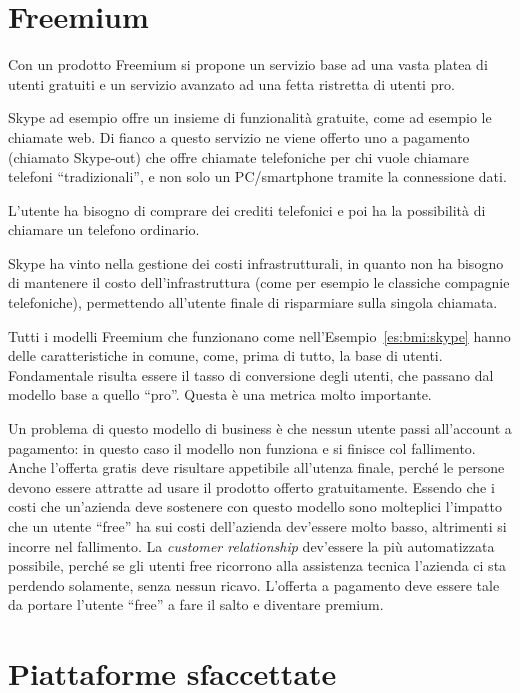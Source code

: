 \section{Freemium}

Con un prodotto Freemium si propone un servizio base ad una vasta platea di
utenti gratuiti e un servizio avanzato ad una fetta ristretta di utenti pro.

\begin{example}[Skype]\label{es:bmi:skype}
Skype ad esempio offre un insieme di funzionalità gratuite, come ad esempio le
chiamate web. Di fianco a questo servizio ne viene offerto uno a pagamento
(chiamato Skype-out) che offre chiamate telefoniche per chi vuole chiamare
telefoni ``tradizionali'', e non solo un PC/smartphone tramite la connessione
dati.

\noindent L'utente ha bisogno di comprare dei crediti telefonici e poi ha la
possibilità di chiamare un telefono ordinario.

\noindent Skype ha vinto nella gestione dei costi infrastrutturali, in quanto
non ha bisogno di mantenere il costo dell'infrastruttura (come per esempio le
classiche compagnie telefoniche), permettendo all'utente finale di risparmiare
sulla singola chiamata.
\end{example}

\noindent Tutti i modelli Freemium che funzionano come
nell'Esempio~\ref{es:bmi:skype} hanno delle caratteristiche in comune, come,
prima di tutto, la base di utenti.
Fondamentale risulta essere il tasso di conversione degli utenti, che passano
dal modello base a quello ``pro''. Questa è una metrica molto importante.

Un problema di questo modello di business è che nessun utente passi all'account
a pagamento: in questo caso il modello non funziona e si finisce col
fallimento. Anche l'offerta gratis deve risultare appetibile all'utenza finale,
perché le persone devono essere attratte ad usare il prodotto offerto
gratuitamente. Essendo che i costi che un'azienda deve sostenere con questo
modello sono molteplici l'impatto che un utente ``free'' ha sui costi
dell'azienda dev'essere molto basso, altrimenti si incorre nel fallimento.
La \textit{customer relationship} dev'essere la più automatizzata possibile,
perché se gli utenti free ricorrono alla assistenza tecnica l'azienda ci sta
perdendo solamente, senza nessun ricavo.
L'offerta a pagamento deve essere tale da portare l'utente ``free'' a fare il
salto e diventare premium.

\section{Piattaforme sfaccettate}

